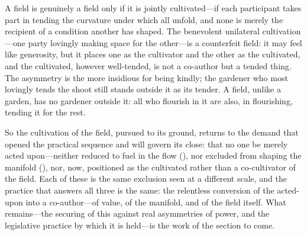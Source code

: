 \begin{claim}
A field is genuinely a field only if it is jointly cultivated---if each participant takes part in tending the curvature under which all unfold, and none is merely the recipient of a condition another has shaped. The benevolent unilateral cultivation---one party lovingly making space for the other---is a counterfeit field: it may feel like generosity, but it places one as the cultivator and the other as the cultivated, and the cultivated, however well-tended, is not a co-author but a tended thing. The asymmetry is the more insidious for being kindly; the gardener who most lovingly tends the shoot still stands outside it as its tender. A field, unlike a garden, has no gardener outside it: all who flourish in it are also, in flourishing, tending it for the rest.
\end{claim}

So the cultivation of the field, pursued to its ground, returns to the demand that opened the practical sequence and will govern its close: that no one be merely acted upon---neither reduced to fuel in the flow (), nor excluded from shaping the manifold (), nor, now, positioned as the cultivated rather than a co-cultivator of the field. Each of these is the same exclusion seen at a different scale, and the practice that answers all three is the same: the relentless conversion of the acted-upon into a co-author---of value, of the manifold, and of the field itself.  What remains---the securing of this against real asymmetries of power, and the legislative practice by which it is held---is the work of the section to come.
